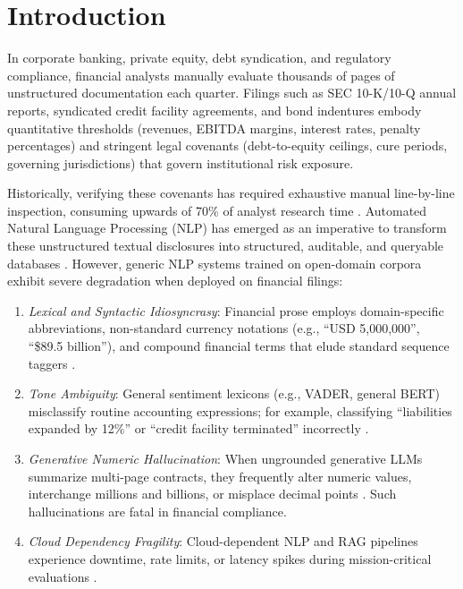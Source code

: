 \documentclass[conference]{IEEEtran}
\begin{document}
\section{Introduction}
In corporate banking, private equity, debt syndication, and regulatory compliance, financial analysts manually evaluate thousands of pages of unstructured documentation each quarter. Filings such as SEC 10-K/10-Q annual reports, syndicated credit facility agreements, and bond indentures embody quantitative thresholds (revenues, EBITDA margins, interest rates, penalty percentages) and stringent legal covenants (debt-to-equity ceilings, cure periods, governing jurisdictions) that govern institutional risk exposure. 

Historically, verifying these covenants has required exhaustive manual line-by-line inspection, consuming upwards of 70\% of analyst research time \cite{b10}. Automated Natural Language Processing (NLP) has emerged as an imperative to transform these unstructured textual disclosures into structured, auditable, and queryable databases \cite{b1}. However, generic NLP systems trained on open-domain corpora exhibit severe degradation when deployed on financial filings:
\begin{enumerate}
    \item \textit{Lexical and Syntactic Idiosyncrasy}: Financial prose employs domain-specific abbreviations, non-standard currency notations (e.g., ``USD 5,000,000'', ``\$89.5 billion''), and compound financial terms that elude standard sequence taggers \cite{b2}.
    \item \textit{Tone Ambiguity}: General sentiment lexicons (e.g., VADER, general BERT) misclassify routine accounting expressions; for example, classifying ``liabilities expanded by 12\%'' or ``credit facility terminated'' incorrectly \cite{b7}.
    \item \textit{Generative Numeric Hallucination}: When ungrounded generative LLMs summarize multi-page contracts, they frequently alter numeric values, interchange millions and billions, or misplace decimal points \cite{b4}. Such hallucinations are fatal in financial compliance.
    \item \textit{Cloud Dependency Fragility}: Cloud-dependent NLP and RAG pipelines experience downtime, rate limits, or latency spikes during mission-critical evaluations \cite{b11}.
\end{enumerate}
\end{document}
